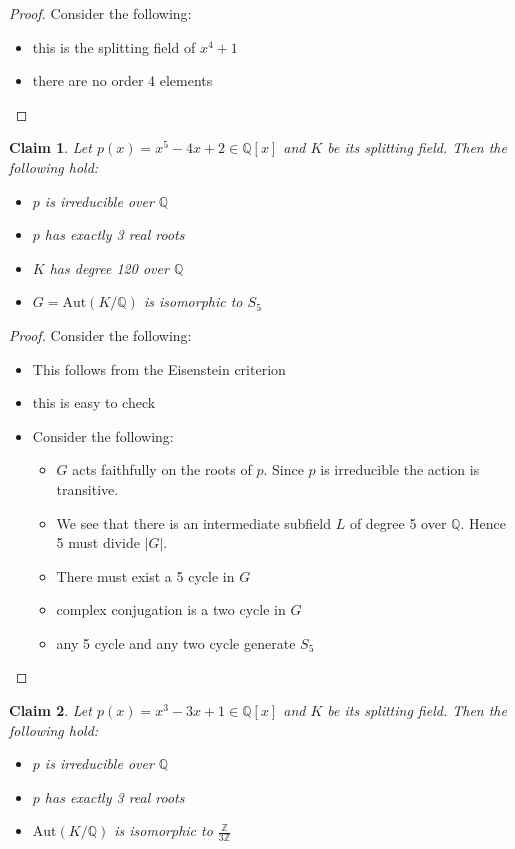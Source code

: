 \documentclass{article}
\newtheorem{claim}{Claim}
\begin{document}
\begin{proof}
  Consider the following:
  \begin{itemize}
    \item this is the splitting field of $x^4+1$
    \item there are no order 4 elements
  \end{itemize}
\end{proof}

\begin{claim}
  Let $p(x)=x^5-4x+2 \in \mathbb{Q}[x]$ and $K$ be its splitting field. Then the following hold:
  \begin{itemize}
    \item $p$ is irreducible over $\mathbb{Q}$
    \item $p$ has exactly 3 real roots
    \item $K$ has degree 120 over $\mathbb{Q}$ 
    \item $G = \text{Aut}(K/\mathbb{Q})$ is isomorphic to $S_5$
  \end{itemize}
\end{claim}

\begin{proof}
  Consider the following:
  \begin{itemize}
    \item This follows from the Eisenstein criterion
    \item this is easy to check
    \item Consider the following:
          \begin{itemize}
            \item $G$ acts faithfully on the roots of $p$. Since $p$ is irreducible the action is transitive.
            \item We see that there is an intermediate subfield $L$ of degree 5 over $\mathbb{Q}$. Hence 5 must divide $|G|$.
            \item There must exist a 5 cycle in $G$
            \item complex conjugation is a two cycle in $G$
            \item any 5 cycle and any two cycle generate $S_5$
          \end{itemize} 
  \end{itemize}
\end{proof}

\begin{claim}
  Let $p(x)=x^3-3x+1 \in \mathbb{Q}[x]$ and $K$ be its splitting field. Then the following hold:
  \begin{itemize}
    \item $p$ is irreducible over $\mathbb{Q}$
    \item $p$ has exactly 3 real roots
    \item $\text{Aut}(K/\mathbb{Q})$ is isomorphic to $\frac{\mathbb{Z}}{3\mathbb{Z}}$
  \end{itemize}
\end{claim}
\end{document}
